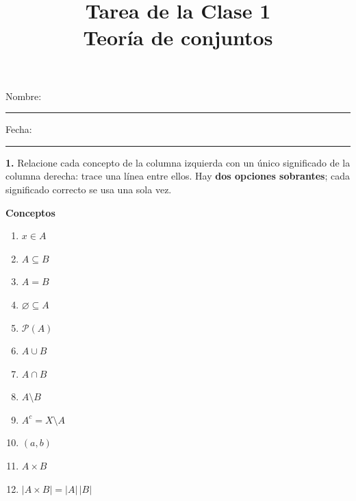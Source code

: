 \documentclass[11pt,a4paper]{article}
\title{Tarea de la Clase 1\\\large Teoría de conjuntos}
\author{}
\date{}
\newcommand{\PP}{\mathcal{P}}
\newcommand{\card}[1]{\lvert #1\rvert}
\begin{document}
\maketitle
\vspace{-1.2cm}
\par
\vspace{0.35cm}
\noindent Nombre: \rule{8cm}{0.4pt}\hfill Fecha: \rule{3cm}{0.4pt}

\noindent\textbf{1.} Relacione cada concepto de la columna izquierda con un único significado de la columna derecha: trace una línea entre ellos. Hay \textbf{dos opciones sobrantes}; cada significado correcto se usa una sola vez.

\vspace{0.2cm}
\small
\noindent
\begin{minipage}[t]{0.28\textwidth}
\textbf{Conceptos}
\begin{enumerate}[label=\Alph*., leftmargin=*, itemsep=0.95em, topsep=0.4em]
    \item $x\in A$
    \item $A\subseteq B$
    \item $A=B$
    \item $\varnothing\subseteq A$
    \item $\PP(A)$
    \item $A\cup B$
    \item $A\cap B$
    \item $A\setminus B$
    \item $A^c=X\setminus A$
    \item $(a,b)$
    \item $A\times B$
    \item $\card{A\times B}=\card{A}\,\card{B}$
\end{enumerate}
\end{minipage}\hfill
\end{document}
